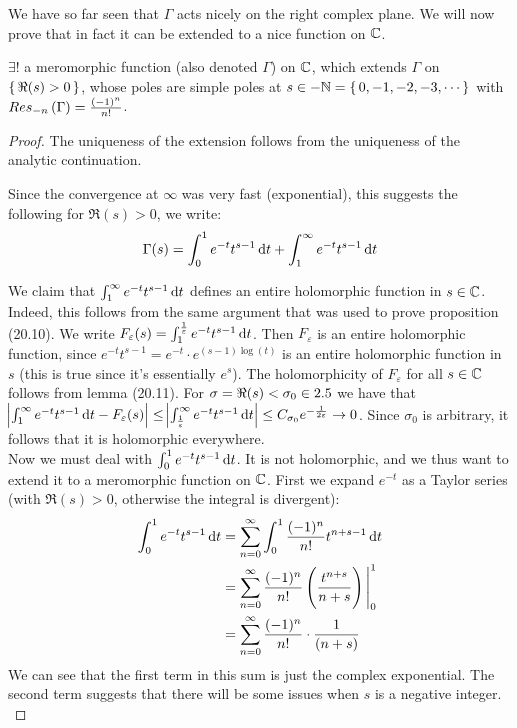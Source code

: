 We have so far seen that $\Gamma$ acts nicely on the right complex plane. We will now prove that in fact it can be extended to a nice function on $\mathbb{C}$.

\begin{theorem}
$\exists!$ a meromorphic function (also denoted $\Gamma$) on $\mathbb{C}$, which extends $\Gamma$ on $\set{ \Re(s) >0}$, whose poles are simple poles at $s \in - \mathbb{N} = \set{0 , -1, -2, -3, \cdots}$ with $Res_{-n} \left( \Gamma \right) = \frac{(-1)^n}{n!}$.
\end{theorem}

\begin{proof}
The uniqueness of the extension follows from the uniqueness of the analytic continuation.

Since the convergence at $\infty$ was very fast (exponential), this suggests the following for $\Re(s) > 0$, we write:
\begin{align*}
    \Gamma(s) = \int_0^1e^{-t}t^{s-1} \dif t + \int_1^\infty e^{-t}t^{s-1} \dif t
\end{align*}

We claim that $\int_1^\infty e^{-t}t^{s-1} \dif t$ defines an entire holomorphic function in $s\in \mathbb{C}$. Indeed, this follows from the same argument that was used to prove proposition (20.10). We write $F_\varepsilon (s) = \int_1^{\frac{1}{\varepsilon}} e^{-t}t^{s-1} \dif t$. Then $F_\varepsilon$ is an entire holomorphic function, since $e^{-t}t^{s-1} = e^{-t} \cdot e^{(s-1)\log(t)}$ is an entire holomorphic function in $s$ (this is true since it's essentially $e^s$). The holomorphicity of $F_\varepsilon$ for all $s \in \mathbb{C}$ follows from lemma (20.11). For $\sigma = \Re(s) < \sigma_0 \in 2.5$ we have that $\abs{ \int_1^\infty e^{-t}t^{s-1} \dif t -    F_\varepsilon (s) } \leq \abs{\int_{\frac{1}{\varepsilon}}^\infty e^{-t}t^{s-1} \dif t} \leq C_{\sigma_0} e^{-\frac{1}{2 \varepsilon}} \to 0$. Since $\sigma_0$ is arbitrary, it follows that it is holomorphic everywhere.\\

Now we must deal with $\int_0^1e^{-t}t^{s-1} \dif t$. It is not holomorphic, and we thus want to extend it to a meromorphic function on $\mathbb{C}$. First we expand $e^{-t}$ as a Taylor series (with $\Re(s) > 0$, otherwise the integral is divergent):
\begin{align*}
    \int_0^1e^{-t}t^{s-1} \dif t &= \sum_{n=0}^\infty \int_0^1 \frac{(-1)^n}{n!}t^{n+s-1} \dif t\\
    &=\sum_{n=0}^\infty \frac{(-1)^n}{n!} \br{\frac{t^{n+s}}{n+s}} \Bigg|_0^1\\
    &= \sum_{n=0}^\infty \frac{(-1)^n}{n!} \cdot \frac{1}{(n+s)}
\end{align*}
We can see that the first term in this sum is just the complex exponential. The second term suggests that there will be some issues when $s$ is a negative integer.\\


\end{proof}
